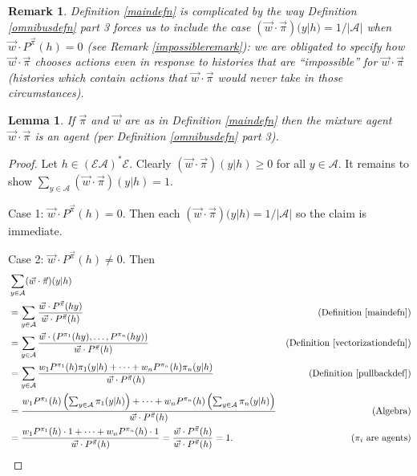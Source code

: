 \documentclass[twoside]{article}
\newtheorem{remark}[theorem]{Remark}
\newtheorem{lemma}[theorem]{Lemma}
\begin{document}
\begin{remark}
    Definition \ref{maindefn} is complicated by the way
    Definition \ref{omnibusdefn} part 3
    forces us to include the case
    $(\vec w\cdot\vec\pi)(y|h)=1/|\mathcal A|$ when
    $\vec w\cdot {P^{\vec\pi}}(h)=0$
    (see Remark \ref{impossibleremark}): we are obligated to specify how
    $\vec w\cdot\vec\pi$ chooses actions even in response to histories that
    are ``impossible'' for $\vec w\cdot\vec\pi$ (histories which contain actions that
    $\vec w\cdot\vec\pi$ would never take in those circumstances).
\end{remark}

\begin{lemma}
\label{mixturereallyisanagent}
    If $\vec\pi$ and $\vec w$ are as in Definition \ref{maindefn}
    then the mixture agent $\vec w\cdot\vec\pi$ is an agent
    (per Definition \ref{omnibusdefn} part 3).
\end{lemma}

\begin{proof}
    Let $h\in(\mathcal E\mathcal A)^*\mathcal E$.
    Clearly $(\vec w\cdot\vec\pi)(y|h)\geq 0$ for all $y\in\mathcal A$.
    It remains to show
    $\sum_{y\in\mathcal A}(\vec w\cdot\vec\pi)(y|h)=1$.

    Case 1: $\vec w\cdot {P^{\vec\pi}}(h)=0$. Then
    each $(\vec w\cdot\vec\pi)(y|h)=1/|\mathcal A|$ so the
    claim is immediate.

    Case 2: $\vec w\cdot {P^{\vec\pi}}(h)\not=0$. Then
    \begin{align*}
        &{} \sum_{y\in\mathcal A}(\vec w\cdot\vec\pi)(y|h)\\
            &= \sum_{y\in\mathcal A}
                \frac{\vec w\cdot {P^{\vec\pi}}(hy)}{\vec w\cdot {P^{\vec\pi}}(h)}
                &\mbox{(Definition \ref{maindefn})}\\
            &= \sum_{y\in\mathcal A}
                \frac
                {\vec w\cdot(P^{\pi_1}(hy),\ldots,P^{\pi_n}(hy))}
                {\vec w\cdot {P^{\vec\pi}}(h)}
                &\mbox{(Definition \ref{vectorizationdefn})}\\
            &= \sum_{y\in\mathcal A}
                \frac
                {w_1 P^{\pi_1}(h)\pi_1(y|h)+\cdots+w_n P^{\pi_n}(h)\pi_n(y|h)}
                {\vec w\cdot {P^{\vec\pi}}(h)}
                &\mbox{(Definition \ref{pullbackdef})}\\
            &= \frac{
                w_1 P^{\pi_1}(h)\left(\mbox{$\sum_{y\in\mathcal A}\pi_1(y|h)$}\right)
                +\cdots+
                w_n P^{\pi_n}(h)\left(\mbox{$\sum_{y\in\mathcal A}\pi_n(y|h)$}\right)
                }
                {\vec w\cdot {P^{\vec\pi}}(h)}
                &\mbox{(Algebra)}\\
            &= \frac
                {w_1 P^{\pi_1}(h)\cdot 1 + \cdots + w_n P^{\pi_n}(h)\cdot1}
                {\vec w\cdot {P^{\vec\pi}}(h)}
                =\frac{\vec w\cdot {P^{\vec\pi}}(h)}{\vec w\cdot {P^{\vec\pi}}(h)}=1.
                &\mbox{($\pi_i$ are agents)}
    \end{align*}
\end{proof}
\end{document}
